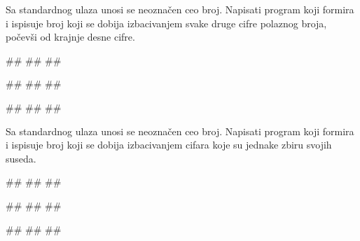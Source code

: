 \begin{Exercise}[label=p1.3_07]
 Sa standardnog ulaza unosi se neoznačen ceo broj. Napisati program
 koji formira i ispisuje broj koji se dobija izbacivanjem svake druge
 cifre polaznog broja, počevši od krajnje desne cifre.
 
\begin{miditest}
\begin{upotreba}{1}
#\naslovInt#
##
##
\end{upotreba}
\end{miditest}
\begin{miditest}
\begin{upotreba}{2}
#\naslovInt#
##
##
\end{upotreba}
\end{miditest}

\begin{miditest}
\begin{upotreba}{3}
#\naslovInt#
##
##
\end{upotreba}
\end{miditest}
\end{Exercise}
\begin{Answer}[ref=p1.3_07]
\end{Answer}

\begin{Exercise}[difficulty=1, label=p1.3_14] 
Sa standardnog ulaza unosi se neoznačen ceo broj. Napisati program
koji formira i ispisuje broj koji se dobija izbacivanjem cifara koje
su jednake zbiru svojih suseda. 

\begin{miditest}
\begin{upotreba}{1}
#\naslovInt#
##
##
\end{upotreba}
\end{miditest}
\begin{miditest}
\begin{upotreba}{2}
#\naslovInt#
##
##
\end{upotreba}
\end{miditest}

\begin{miditest}
\begin{upotreba}{3}
#\naslovInt#
##
##
\end{upotreba}
\end{miditest}
\end{Exercise}
\begin{Answer}[ref=p1.3_14]
\end{Answer}

